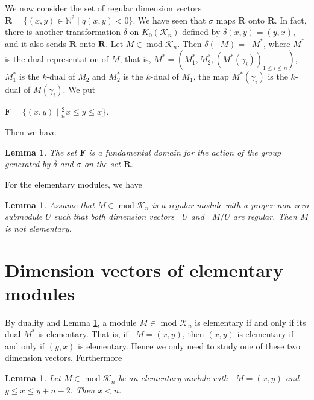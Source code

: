 \documentclass[a4paper,12pt]{amsart}
\newcommand{\cK}{\mathcal{K}}
\DeclareMathOperator{\modd}{mod}
\DeclareMathOperator{\dimu}{\underline{dim}}
\newtheorem{Lemma}[proposition]{Lemma}
\begin{document}
We now consider  the set   of regular dimension vectors  $\mathbf{R}=\{(x,y)\in \mathbb{N}^2\mid q(x,y)<0\}$. We have seen that $\sigma$ maps $\mathbf{R}$ onto $\mathbf{R}$. In fact, there is another transformation $\delta$ on $K_0(\cK_n)$ defined by $\delta(x,y)=(y,x)$, and  it also sends $\mathbf{R}$ onto $\mathbf{R}$.  Let $M\in \modd \cK_n$.  Then $\delta (\dimu M)=\dimu M^*$,  where $M^*$ is the dual representation of $M$, that is,  $M^*=(M^*_1,M^*_2,(M^*(\gamma_i))_{1\leq i\leq n})$, $M^*_1$  is the $k$-dual of $M_2$ and $M^*_2$ is the $k$-dual of $M_1$, the map $M^*(\gamma_i)$ is the $k$-dual of $M(\gamma_i)$. We put 


\begin{center}
$\mathbf{F}=\{(x,y)\mid \frac{2}{n}x\leq y\leq x\}.$
\end{center}

Then we have 
\begin{Lemma}\cite[Section 2. Lemma]{Claus2}
The set $\mathbf{F}$ is a fundamental domain for the action of the group generated by $\delta$ and $\sigma$ on the set $\mathbf{R}.$ 
\end{Lemma}

For the elementary modules, we have 

\begin{Lemma} \cite[Lemma 3.1]{Claus2}\label{regular}
Assume that $M\in\modd \mathcal{K}_n$ is a regular module with a proper non-zero submodule $U$ such that both dimension vectors $\dimu U$ and $\dimu M/ U$ are regular. Then $M$ is not elementary.
\end{Lemma}



\section{Dimension vectors of elementary modules } 

 


 
 


By duality and Lemma \ref{regular},  a module $M\in$ mod $\cK_n$ is elementary if and only if its dual $M^*$ is elementary. That is, if $\dimu M=(x,y)$, then $(x,y)$ is elementary if and only if $(y,x)$ is elementary. Hence we only need to study one of these two dimension vectors. Furthermore

\begin{Lemma}\cite[Lemma 14.11]{Daniel}\label{less n}
Let $M\in \modd \cK_n$  be an elementary module with $\dimu M=(x,y)$ and $y\leq x\leq y+n-2.$ Then $x< n.$
\end{Lemma}
\end{document}
